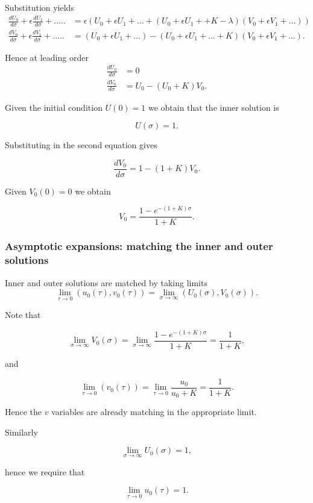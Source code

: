 \documentclass[
  letterpaper,
  DIV=11,
  numbers=noendperiod]{scrreprt}
\begin{document}
Substitution yields \[
\begin{aligned}
\frac{dU_0}{d\sigma}+ \epsilon\frac{dU_1}{d\sigma}+ ..... &= \epsilon\left( U_0+\epsilon U_1 + ... + (U_0+\epsilon U_1+ +K-\lambda)(V_0+\epsilon V_1+...)\right) \\
\frac{dV_0}{d\sigma}+ \epsilon\frac{dV_1}{d\sigma}+ ..... &= (U_0+\epsilon U_1+...)-(U_0+\epsilon U_1+...+K)(V_0+\epsilon V_1+...).
\end{aligned}
\]

Hence at leading order \[
\begin{aligned}
\frac{dU_0}{d\sigma}&=0  \nonumber\\
\frac{dV_0}{d\sigma}&=U_0-(U_0+K)V_0.
\end{aligned}
\]

Given the initial condition \(U(0)=1\) we obtain that the inner solution
is

\[
U(\sigma)=1.
\]

Substituting in the second equation gives

\[
 \frac{dV_0}{d\sigma}=1-(1+K)V_0.
\]

Given \(V_0(0)=0\) we obtain

\[
V_0=\frac{1-e^{-(1+K)\sigma}}{1+K}.
\]

\subsubsection{Asymptotic expansions: matching the inner and outer
solutions}\label{asymptotic-expansions-matching-the-inner-and-outer-solutions}

Inner and outer solutions are matched by taking limits \[
\lim_{\tau \rightarrow 0}(u_0(\tau),v_0(\tau))=\lim_{\sigma \rightarrow \infty}(U_0(\sigma),V_0(\sigma)).
\]

Note that

\[
\lim_{\sigma\rightarrow \infty} V_0(\sigma)= \lim_{\sigma\rightarrow \infty}  \frac{1-e^{-(1+K)\sigma}}{1+K} = \frac{1}{1+K},
\]

and

\[
\lim_{\tau\rightarrow 0}(v_0(\tau)) =\lim_{\tau\rightarrow 0}\frac{u_0}{u_0+K} =  \frac{1}{1+K}. 
\]

Hence the \(v\) variables are already matching in the appropriate limit.

Similarly

\[
\lim_{\sigma\rightarrow \infty} U_0(\sigma)= 1,
\]

hence we require that

\[
\lim_{\tau \rightarrow 0} u_0(\tau)= 1.
\]
\end{document}
